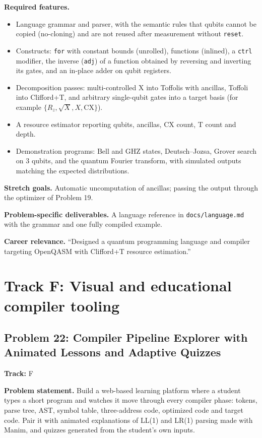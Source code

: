 \documentclass[11pt,a4paper]{article}
\newcommand{\fld}[1]{\par\smallskip\textbf{\color{accent}#1}\quad}
\newcommand{\meta}[1]{%
  \begin{tcolorbox}[colback=softbg,colframe=softbg,boxsep=2pt,left=4pt,right=4pt,top=2pt,bottom=2pt,arc=2pt]
  \small\textbf{Track:} #1
  \end{tcolorbox}}
\begin{document}
\fld{Required features.}
\begin{itemize}
  \item Language grammar and parser, with the semantic rules that qubits cannot be copied (no-cloning) and are not reused after measurement without \texttt{reset}.
  \item Constructs: \texttt{for} with constant bounds (unrolled), functions (inlined), a \texttt{ctrl} modifier, the inverse (\texttt{adj}) of a function obtained by reversing and inverting its gates, and an in-place adder on qubit registers.
  \item Decomposition passes: multi-controlled X into Toffolis with ancillas, Toffoli into Clifford+T, and arbitrary single-qubit gates into a target basis (for example $\{R_z, \sqrt{X}, X, \mathrm{CX}\}$).
  \item A resource estimator reporting qubits, ancillas, CX count, T count and depth.
  \item Demonstration programs: Bell and GHZ states, Deutsch--Jozsa, Grover search on 3 qubits, and the quantum Fourier transform, with simulated outputs matching the expected distributions.
\end{itemize}

\fld{Stretch goals.} Automatic uncomputation of ancillas; passing the output through the optimizer of Problem 19.

\fld{Problem-specific deliverables.} A language reference in \texttt{docs/language.md} with the grammar and one fully compiled example.

\fld{Career relevance.} ``Designed a quantum programming language and compiler targeting OpenQASM with Clifford+T resource estimation.''

\section{Track F: Visual and educational compiler tooling}

\subsection{Problem 22: Compiler Pipeline Explorer with Animated Lessons and Adaptive Quizzes}
\meta{F}

\fld{Problem statement.} Build a web-based learning platform where a student types a short program
and watches it move through every compiler phase: tokens, parse tree, AST, symbol table,
three-address code, optimized code and target code. Pair it with animated explanations of LL(1) and
LR(1) parsing made with Manim, and quizzes generated from the student's own inputs.
\end{document}
